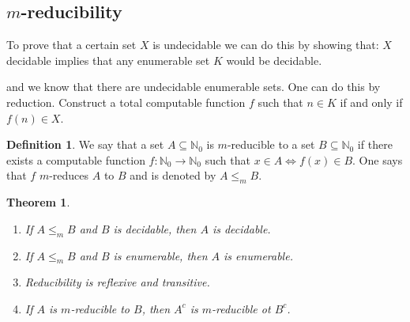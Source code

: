 \documentclass[10pt, letterpaper]{article}
\newcommand{\N}{\mathbb{N}}
\newtheorem{thm}{Theorem}
\theoremstyle{remark}
\theoremstyle{definition}
\newtheorem{defn}{Definition}
\begin{document}
    \subsection*{$m$-reducibility}

    To prove that a certain set $X$ is undecidable we can do this by showing that: $X$ decidable implies that any enumerable set $K$
    would be decidable.

    and we know that there are undecidable enumerable sets. One can do this by reduction. Construct a total computable function $f$ 
    such that $n \in K$ if and only if $f(n) \in X$.

    \begin{defn}
        We say that a set $A \subseteq \N_0$ is $m$-reducible to a set $B \subseteq \N_0$ if there exists a computable function 
        $f:\N_0 \rightarrow \N_0$ such that $x \in A \Leftrightarrow f(x) \in B$. One says that $f$ $m$-reduces $A$ to $B$ and 
        is denoted by $A \leq_m B$.
    \end{defn}

    \begin{thm} \leavevmode 
        \begin{enumerate}
            \item [(a)] If $A \leq_m B$ and $B$ is decidable, then $A$ is decidable.
            \item [(b)] If $A \leq_m B$ and $B$ is enumerable, then $A$ is enumerable.
            \item [(c)] Reducibility is reflexive and transitive.
            \item [(d)] If $A$ is $m$-reducible to $B$, then $A^c$ is $m$-reducible ot $B^c$.
        \end{enumerate}
    \end{thm}
\end{document}
